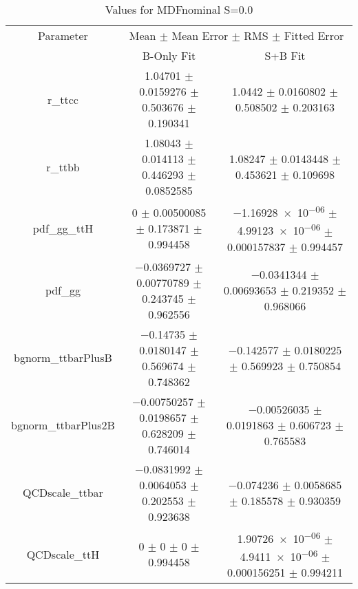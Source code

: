 \begin{table}
\centering
\caption{Values for MDFnominal S=0.0}
\begin{tabular}{ccc}
\toprule
Parameter & \multicolumn{2}{c}{Mean $\pm$ Mean Error $\pm$ RMS $\pm$ Fitted Error}\\
 & B-Only Fit & S+B Fit\\
\midrule
r\_ttcc & \num{1.04701} $\pm$ \num{0.0159276} $\pm$ \num{0.503676} $\pm$ \num{0.190341} & \num{1.0442} $\pm$ \num{0.0160802} $\pm$ \num{0.508502} $\pm$ \num{0.203163}\\
r\_ttbb & \num{1.08043} $\pm$ \num{0.014113} $\pm$ \num{0.446293} $\pm$ \num{0.0852585} & \num{1.08247} $\pm$ \num{0.0143448} $\pm$ \num{0.453621} $\pm$ \num{0.109698}\\
pdf\_gg\_ttH & \num{0} $\pm$ \num{0.00500085} $\pm$ \num{0.173871} $\pm$ \num{0.994458} & \num{-1.16928e-06} $\pm$ \num{4.99123e-06} $\pm$ \num{0.000157837} $\pm$ \num{0.994457}\\
pdf\_gg & \num{-0.0369727} $\pm$ \num{0.00770789} $\pm$ \num{0.243745} $\pm$ \num{0.962556} & \num{-0.0341344} $\pm$ \num{0.00693653} $\pm$ \num{0.219352} $\pm$ \num{0.968066}\\
bgnorm\_ttbarPlusB & \num{-0.14735} $\pm$ \num{0.0180147} $\pm$ \num{0.569674} $\pm$ \num{0.748362} & \num{-0.142577} $\pm$ \num{0.0180225} $\pm$ \num{0.569923} $\pm$ \num{0.750854}\\
bgnorm\_ttbarPlus2B & \num{-0.00750257} $\pm$ \num{0.0198657} $\pm$ \num{0.628209} $\pm$ \num{0.746014} & \num{-0.00526035} $\pm$ \num{0.0191863} $\pm$ \num{0.606723} $\pm$ \num{0.765583}\\
QCDscale\_ttbar & \num{-0.0831992} $\pm$ \num{0.0064053} $\pm$ \num{0.202553} $\pm$ \num{0.923638} & \num{-0.074236} $\pm$ \num{0.0058685} $\pm$ \num{0.185578} $\pm$ \num{0.930359}\\
QCDscale\_ttH & \num{0} $\pm$ \num{0} $\pm$ \num{0} $\pm$ \num{0.994458} & \num{1.90726e-06} $\pm$ \num{4.9411e-06} $\pm$ \num{0.000156251} $\pm$ \num{0.994211}\\
\bottomrule
\end{tabular}
\end{table}